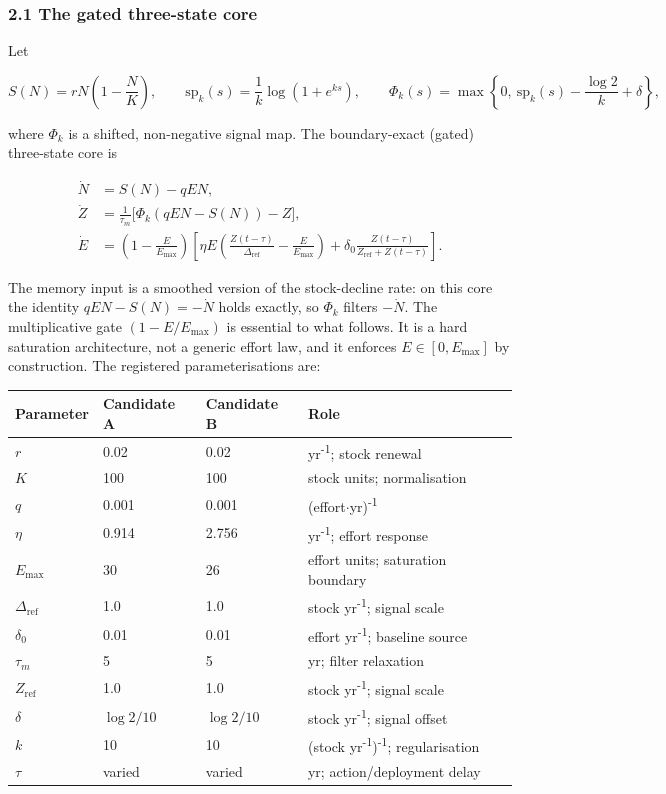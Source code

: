 \documentclass[11pt]{article}
\begin{document}
\subsubsection{2.1 The gated three-state
core}\label{the-gated-three-state-core}

Let

\[S(N) = rN\left(1 - \frac{N}{K}\right), \qquad \mathrm{sp}_k(s) = \frac{1}{k}\log(1 + e^{ks}), \qquad \Phi_k(s) = \max\left\{0,\ \mathrm{sp}_k(s) - \frac{\log 2}{k} + \delta\right\},\]

where \(\Phi_k\) is a shifted, non-negative signal map. The
boundary-exact (gated) three-state core is

\[\begin{aligned}
\dot N &= S(N) - qEN, \\
\dot Z &= \frac{1}{\tau_m}\bigl[\Phi_k(qEN - S(N)) - Z\bigr], \\
\dot E &= \left(1 - \frac{E}{E_{\max}}\right)\left[\eta E\left(\frac{Z(t-\tau)}{\Delta_{\mathrm{ref}}} - \frac{E}{E_{\max}}\right) + \delta_0\frac{Z(t-\tau)}{Z_{\mathrm{ref}} + Z(t-\tau)}\right].
\end{aligned} \tag{1}\]

The memory input is a smoothed version of the stock-decline rate: on
this core the identity \(qEN - S(N) = -\dot N\) holds exactly, so
\(\Phi_k\) filters \(-\dot N\). The multiplicative gate
\((1 - E/E_{\max})\) is essential to what follows. It is a hard
saturation architecture, not a generic effort law, and it enforces
\(E \in [0, E_{\max}]\) by construction. The registered
parameterisations are:

\begin{longtable}[]{@{}llll@{}}
\toprule\noalign{}
Parameter & Candidate A & Candidate B & Role \\
\midrule\noalign{}
\endhead
\bottomrule\noalign{}
\endlastfoot
\(r\) & 0.02 & 0.02 & yr\textsuperscript{-1}; stock renewal \\
\(K\) & 100 & 100 & stock units; normalisation \\
\(q\) & 0.001 & 0.001 & (effort\ensuremath{\cdot}yr)\textsuperscript{-1} \\
\(\eta\) & 0.914 & 2.756 & yr\textsuperscript{-1}; effort response \\
\(E_{\max}\) & 30 & 26 & effort units; saturation boundary \\
\(\Delta_{\mathrm{ref}}\) & 1.0 & 1.0 & stock yr\textsuperscript{-1}; signal scale \\
\(\delta_0\) & 0.01 & 0.01 & effort yr\textsuperscript{-1}; baseline source \\
\(\tau_m\) & 5 & 5 & yr; filter relaxation \\
\(Z_{\mathrm{ref}}\) & 1.0 & 1.0 & stock yr\textsuperscript{-1}; signal scale \\
\(\delta\) & \(\log 2/10\) & \(\log 2/10\) & stock yr\textsuperscript{-1}; signal
offset \\
\(k\) & 10 & 10 & (stock yr\textsuperscript{-1})\textsuperscript{-1}; regularisation \\
\(\tau\) & varied & varied & yr; action/deployment delay \\
\end{longtable}
\end{document}
